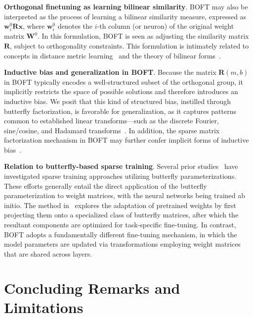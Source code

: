 \textbf{Orthogonal finetuning as learning bilinear similarity}. BOFT may also be interpreted as the process of learning a bilinear similarity measure, expressed as $\bm{w}^0_i\bm{R}\bm{x}$, where $\bm{w}^0_i$ denotes the $i$-th column (or neuron) of the original weight matrix $\bm{W}^0$. In this formulation, BOFT is seen as adjusting the similarity matrix $\bm{R}$, subject to orthogonality constraints. This formulation is intimately related to concepts in distance metric learning~\cite{xing2002distance} and the theory of bilinear forms~\cite{roman2005advanced}.

\textbf{Inductive bias and generalization in BOFT}. Because the matrix $\bm{R}(m,b)$ in BOFT typically encodes a well-structured subset of the orthogonal group, it implicitly restricts the space of possible solutions and therefore introduces an inductive bias. We posit that this kind of structured bias, instilled through butterfly factorization, is favorable for generalization, as it captures patterns common to established linear transforms—such as the discrete Fourier, sine/cosine, and Hadamard transforms~\cite{dao2019kaleidoscope}. In addition, the sparse matrix factorization mechanism in BOFT may further confer implicit forms of inductive bias~\cite{gunasekar2017implicit,li2018algorithmic,liu2019neural}.

\textbf{Relation to butterfly-based sparse training}. Several prior studies~\cite{dao2019learning,dao2019kaleidoscope,chen2022pixelated,dao2022monarch} have investigated sparse training approaches utilizing butterfly parameterizations. These efforts generally entail the direct application of the butterfly parameterization to weight matrices, with the neural networks being trained ab initio. The method in~\cite{dao2022monarch} explores the adaptation of pretrained weights by first projecting them onto a specialized class of butterfly matrices, after which the resultant components are optimized for task-specific fine-tuning. In contrast, BOFT adopts a fundamentally different fine-tuning mechanism, in which the model parameters are updated via transformations employing weight matrices that are shared across layers.



\section{Concluding Remarks and Limitations}

